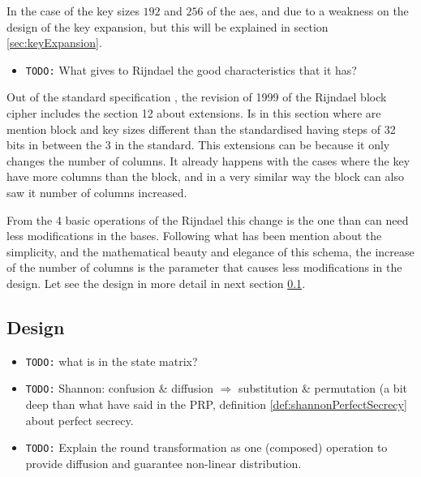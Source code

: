 \documentclass[10pt,a4paper,twoside]{llncs}
\begin{document}
In the case of the key sizes $192$ and $256$ of the aes, and due to a weakness on the design of the key expansion, but this will be explained in section \ref{sec:keyExpansion}.

\begin{itemize}
 \item \texttt{TODO:} What gives to Rijndael the good characteristics that it has?
\end{itemize}

Out of the standard specification \cite{AES-FIPS}, the revision of 1999 of the Rijndael block cipher \cite{Daemen01aes-ammended} includes the section 12 about extensions. Is in this section where are mention block and key sizes different than the standardised having steps of 32 bits in between the 3 in the standard. This extensions can be because it only changes the number of columns. It already happens with the cases where the key have more columns than the block, and in a very similar way the block can also saw it number of columns increased.

From the 4 basic operations of the Rijndael this change is the one than can need less modifications in the bases. Following what has been mention about the simplicity, and the mathematical beauty and elegance of this schema, the increase of the number of columns is the parameter that causes less modifications in the design. Let see the design in more detail in next section \ref{sec:design}.


\subsection{Design}\label{sec:design}
\begin{itemize}
 \item \texttt{TODO:} what is in the state matrix?
 \item \texttt{TODO:} Shannon: confusion \& diffusion $\Rightarrow$ substitution \& permutation \cite{shannon-comTheorySecSys} (a bit deep than what have said in the PRP, definition \ref{def:shannonPerfectSecrecy} about perfect secrecy.
 \item \texttt{TODO:} Explain the round transformation as one (composed) operation to provide diffusion and guarantee non-linear distribution.
\end{itemize}
\end{document}
